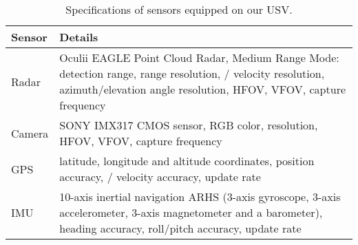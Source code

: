 \documentclass[lettersize,journal]{IEEEtran}
\begin{document}
\begin{table}[hbt]
\caption{Specifications of sensors equipped on our USV.}
\footnotesize
\begin{tabular*}{\linewidth}{p{0.8cm}  p{7.2cm}}
\toprule
\bf{Sensor} & \bf{Details} \\\midrule
Radar & Oculii EAGLE  Point Cloud Radar, Medium Range Mode:  detection range,  range resolution, / velocity resolution,  azimuth/elevation angle resolution,  HFOV,  VFOV,  capture frequency\\
\vspace{-1mm} Camera & \vspace{-1mm} SONY IMX317 CMOS sensor, RGB color,  resolution,  HFOV,  VFOV,  capture frequency\\
\vspace{-1mm} GPS & \vspace{-1mm} latitude, longitude and altitude coordinates,  position accuracy, / velocity accuracy,  update rate\\
\vspace{-1mm} IMU & \vspace{-1mm} 10-axis inertial navigation ARHS (3-axis gyroscope, 3-axis accelerometer, 3-axis magnetometer and a barometer),  heading accuracy,  roll/pitch accuracy,  update rate\\
\bottomrule
\end{tabular*}

\label{tab:sensors}
\end{table}
\end{document}
